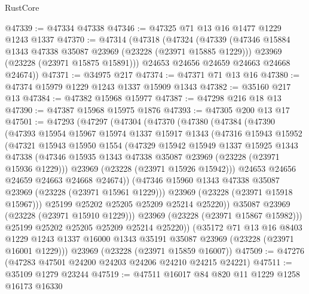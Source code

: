 \begin{lexlean}{RustCore}
\begin{coremodule}
@47339 := @47334 @47338
@47346 := @47325 @71 @13 @16 @1477 @1229 @1243 @1337
@47370 := @47314
    (@47318
      (@47324
        (@47339
          (@47346 @15884 @1343 @47338 @35087 @23969 (@23228 (@23971 @15885 @1229)))
          @23969
          (@23228 (@23971 @15875 @15891)))
        @24653
        @24656
        @24659
        @24663
        @24668
        @24674))
@47371 := @34975 @217
@47374 := @47371 @71 @13 @16
@47380 := @47374 @15979 @1229 @1243 @1337 @15909 @1343
@47382 := @35160 @217 @13
@47384 := @47382 @15968 @15977
@47387 := @47298 @216 @18 @13
@47390 := @47387 @15968 @15975 @1876
@47393 := @47305 @200 @13 @17
@47501 := @47293
    (@47297
      (@47304
        (@47370
          (@47380
            (@47384
              (@47390
                (@47393
                  @15954
                  @15967
                  @15974
                  @1337
                  @15917
                  @1343
                  (@47316
                    @15943
                    @15952
                    (@47321
                      @15943
                      @15950
                      @1554
                      (@47329
                        @15942
                        @15949
                        @1337
                        @15925
                        @1343
                        @47338
                        (@47346 @15935 @1343 @47338 @35087 @23969 (@23228 (@23971 @15936 @1229)))
                        @23969
                        (@23228 (@23971 @15926 @15942)))
                      @24653
                      @24656
                      @24659
                      @24663
                      @24668
                      @24674))
                  (@47346 @15960 @1343 @47338 @35087 @23969 (@23228 (@23971 @15961 @1229)))
                  @23969
                  (@23228 (@23971 @15918 @15967)))
                @25199
                @25202
                @25205
                @25209
                @25214
                @25220))
            @35087
            @23969
            (@23228 (@23971 @15910 @1229)))
          @23969
          (@23228 (@23971 @15867 @15982)))
        @25199
        @25202
        @25205
        @25209
        @25214
        @25220))
    (@35172
      @71
      @13
      @16
      @8403
      @1229
      @1243
      @1337
      @16000
      @1343
      @35191
      @35087
      @23969
      (@23228 (@23971 @16001 @1229)))
    @23969
    (@23228 (@23971 @15859 @16007))
@47509 := @47276 (@47283 @47501 @24200 @24203 @24206 @24210 @24215 @24221)
@47511 := @35109 @1279 @23244
@47519 := @47511 @16017 @84 @820 @11 @1229 @1258 @16173 @16330

\end{coremodule}
\end{lexlean}
